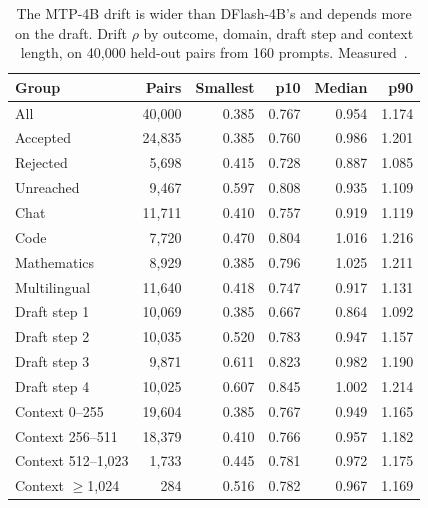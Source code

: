 \begin{table}[htbp]
\tablefont\centering
\caption{The MTP-4B drift is wider than DFlash-4B's and depends more on the draft. Drift $\rho$ by outcome, domain, draft step and context length, on 40,000 held-out pairs from 160 prompts. Measured~.}
\label{tab:rho-groups-mtp}
\vskip 0.05in
\begin{tabular}{@{}lrrrrr@{}}\toprule
Group & Pairs & Smallest & p10 & Median & p90\\\midrule
All & 40{,}000 & 0.385 & 0.767 & 0.954 & 1.174\\\addlinespace
Accepted & 24{,}835 & 0.385 & 0.760 & 0.986 & 1.201\\
Rejected & 5{,}698 & 0.415 & 0.728 & 0.887 & 1.085\\
Unreached & 9{,}467 & 0.597 & 0.808 & 0.935 & 1.109\\\addlinespace
Chat & 11{,}711 & 0.410 & 0.757 & 0.919 & 1.119\\
Code & 7{,}720 & 0.470 & 0.804 & 1.016 & 1.216\\
Mathematics & 8{,}929 & 0.385 & 0.796 & 1.025 & 1.211\\
Multilingual & 11{,}640 & 0.418 & 0.747 & 0.917 & 1.131\\\addlinespace
Draft step 1 & 10{,}069 & 0.385 & 0.667 & 0.864 & 1.092\\
Draft step 2 & 10{,}035 & 0.520 & 0.783 & 0.947 & 1.157\\
Draft step 3 & 9{,}871 & 0.611 & 0.823 & 0.982 & 1.190\\
Draft step 4 & 10{,}025 & 0.607 & 0.845 & 1.002 & 1.214\\\addlinespace
Context 0--255 & 19{,}604 & 0.385 & 0.767 & 0.949 & 1.165\\
Context 256--511 & 18{,}379 & 0.410 & 0.766 & 0.957 & 1.182\\
Context 512--1{,}023 & 1{,}733 & 0.445 & 0.781 & 0.972 & 1.175\\
Context $\ge$1{,}024 & 284 & 0.516 & 0.782 & 0.967 & 1.169\\\bottomrule
\end{tabular}
\end{table}

